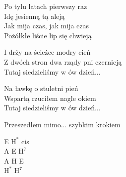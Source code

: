 \begin{text}
    Po tylu latach pierwszy raz\\
    Idę jesienną tą aleją\\
    Jak mija czas, jak mija czas\\
    Pożółkłe liście lip się chwieją

    I drży na ścieżce modry cień\\
    Z dwóch stron dwa rządy pni czernieją\\
    Tutaj siedzieliśmy w ów dzień...

    Na ławkę o stuletni pień\\
    Wspartą rzuciłem nagle okiem\\
    Tutaj siedzieliśmy w ów dzień...

    Przeszedłem mimo... szybkim krokiem
\end{text}
\begin{chord}
    E $\mathrm{H^{*}}$ cis\\
    A E $\mathrm{H^{7}}$\\
    A H E\\
    $\mathrm{H^{*}}$ $\mathrm{H^{7}}$

\end{chord}
